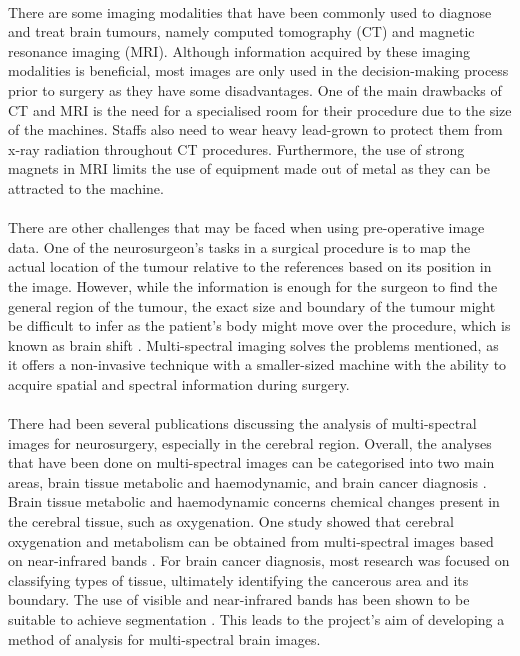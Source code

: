 \documentclass[12pt]{article}
\begin{document}
    \paragraph{}
    There are some imaging modalities that have been commonly used to diagnose and treat brain tumours, namely computed tomography (CT) and magnetic resonance imaging (MRI). Although information acquired by these imaging modalities is beneficial, most images are only used in the decision-making process prior to surgery as they have some disadvantages. One of the main drawbacks of CT and MRI is the need for a specialised room for their procedure due to the size of the machines. Staffs also need to wear heavy lead-grown to protect them from x-ray radiation throughout CT procedures. Furthermore, the use of strong magnets in MRI limits the use of equipment made out of metal as they can be attracted to the machine.
    
    \paragraph{}
    There are other challenges that may be faced when using pre-operative image data. One of the neurosurgeon's tasks in a surgical procedure is to map the actual location of the tumour relative to the references based on its position in the image. However, while the information is enough for the surgeon to find the general region of the tumour, the exact size and boundary of the tumour might be difficult to infer as the patient's body might move over the procedure, which is known as brain shift \cite{gerard_brain_2017}. Multi-spectral imaging solves the problems mentioned, as it offers a non-invasive technique with a smaller-sized machine with the ability to acquire spatial and spectral information during surgery.

    \paragraph{}
    There had been several publications discussing the analysis of multi-spectral images for neurosurgery, especially in the cerebral region. Overall, the analyses that have been done on multi-spectral images can be categorised into two main areas, brain tissue metabolic and haemodynamic, and brain cancer diagnosis \cite{wu_review_2022}. Brain tissue metabolic and haemodynamic concerns chemical changes present in the cerebral tissue, such as oxygenation. One study showed that cerebral oxygenation and metabolism can be obtained from multi-spectral images based on near-infrared bands \cite{nguyen_hyperspectral_2019}. For brain cancer diagnosis, most research was focused on classifying types of tissue, ultimately identifying the cancerous area and its boundary. The use of visible and near-infrared bands has been shown to be suitable to achieve segmentation \cite{fabelo_helicoid_2016}. This leads to the project's aim of developing a method of analysis for multi-spectral brain images.
\end{document}
